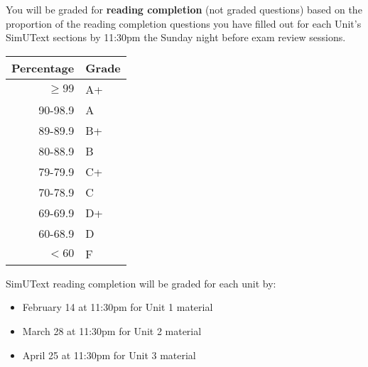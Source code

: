 \documentclass{tufte-handout}
\begin{document}
You will be graded for \textbf{reading completion} (not graded questions) based on the proportion of the reading completion questions you have filled out for each Unit's SimUText sections by 11:30pm the Sunday night before exam review sessions.


\begin{margintable}
\begin{tabular}{rl}
Percentage & Grade \\
\hline 
$\ge99$ & A+ \\
90-98.9 & A \\
89-89.9 & B+ \\
80-88.9 & B \\
79-79.9 & C+ \\
70-78.9 & C \\
69-69.9 & D+ \\
60-68.9 & D \\
$<60$ & F \\
\hline
\end{tabular}
\end{margintable}

SimUText reading completion will be graded for each unit by:
\begin{itemize}
\item February 14 at 11:30pm for Unit 1 material
\item March 28 at 11:30pm for Unit 2 material 
\item April 25 at 11:30pm for Unit 3 material 
\end{itemize}
\end{document}
